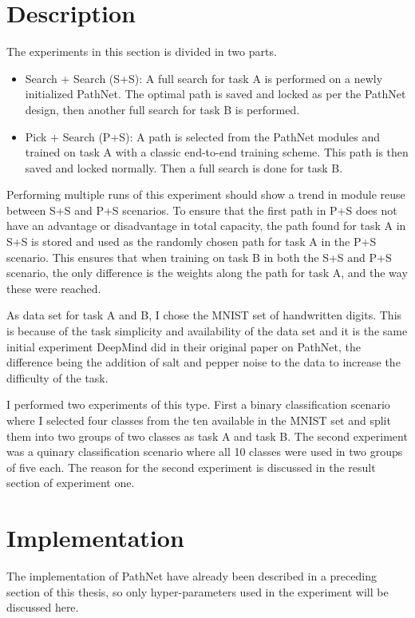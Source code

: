 \section{Description}
The experiments in this section is divided in two parts. 
\begin{itemize}
    \item Search + Search (S+S): A full search for task A is performed on a newly initialized PathNet. The optimal path is saved and locked as per the PathNet design, then another full search for task B is performed.
    \item Pick + Search (P+S): A path is selected from the PathNet modules and trained on task A with a classic end-to-end training scheme. This path is then saved and locked normally. Then a full search is done for task B.
\end{itemize}
Performing multiple runs of this experiment should show a trend in module reuse between S+S and P+S scenarios. To ensure that the first path in P+S does not have an advantage or disadvantage in total capacity,  the path found for task A in S+S is stored and used as the randomly chosen path for task A in the P+S scenario.
This ensures that when training on task B in both the S+S and P+S scenario, the only difference is the weights along the path for task A, and the way these were reached. 

As data set for task A and B, I chose the MNIST set of handwritten digits. This is because of the task simplicity and availability of the data set and it is the same initial experiment DeepMind did in their original paper on PathNet, the difference being the addition of salt and pepper noise to the data to increase the difficulty of the task.

I performed two experiments of this type. First a binary classification scenario where I selected four classes from the ten available in the MNIST set and split them into two groups of two classes as task A and task B. The second experiment was a quinary classification scenario where all 10 classes were used in two groups of five each. The reason for the second experiment is discussed in the result section of experiment one. 

\section{Implementation}\label{exp1:implementation}
The implementation of PathNet have already been described in a preceding section of this thesis, so only hyper-parameters used in the experiment will be discussed here.

